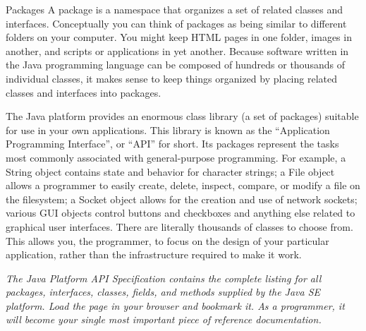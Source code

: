 \documentclass[18pt]{beamer}
\begin{document}
\begin{frame}{Packages}
\tiny
A package is a namespace that organizes a set of related classes and interfaces. 
Conceptually you can think of packages as being similar to different folders on your computer. 
You might keep HTML pages in one folder, images in another, and scripts or applications in yet another. 
Because software written in the Java programming language can be composed of hundreds or thousands of 
individual classes, it makes sense to keep things organized by placing related classes and interfaces into packages.

The Java platform provides an enormous class library (a set of packages) suitable for use in your own 
applications. This library is known as the ``Application Programming Interface'', or ``API'' for short. 
Its packages represent the tasks most commonly associated with general-purpose programming. For example, 
a String object contains state and behavior for character strings; a File object allows a programmer to easily 
create, delete, inspect, compare, or modify a file on the filesystem; a Socket object allows for the creation
and use of network sockets; various GUI objects control buttons and checkboxes and anything else related to 
graphical user interfaces. There are literally thousands of classes to choose from. This allows you, the programmer, 
to focus on the design of your particular application, rather than the infrastructure required to make it work.

\emph{The Java Platform API Specification contains the complete listing for all packages, interfaces, classes, fields, 
and methods supplied by the Java SE platform. Load the page in your browser and bookmark it. As a programmer, 
it will become your single most important piece of reference documentation.}

\end{frame}
\end{document}
